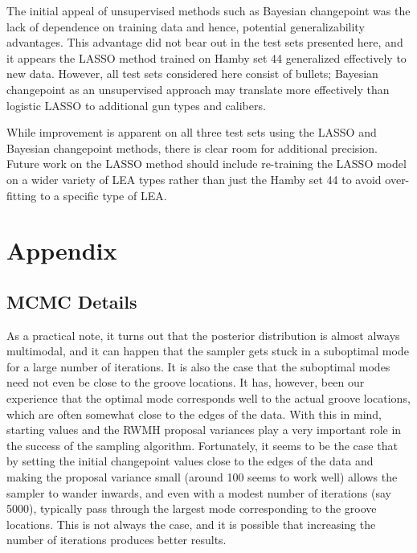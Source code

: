 \documentclass[12pt]{article}
\begin{document}
The initial appeal of unsupervised methods such as Bayesian changepoint
was the lack of dependence on training data and hence, potential
generalizability advantages. This advantage did not bear out in the test
sets presented here, and it appears the LASSO method trained on Hamby
set 44 generalized effectively to new data. However, all test sets
considered here consist of {\color{teal}{9mm?}} bullets; Bayesian
changepoint as an unsupervised approach may translate more effectively
than logistic LASSO to additional gun types and calibers.

While improvement is apparent on all three test sets using the LASSO and
Bayesian changepoint methods, there is clear room for additional
precision. Future work on the LASSO method should include re-training
the LASSO model on a wider variety of LEA types rather than just the
Hamby set 44 to avoid over-fitting to a specific type of LEA.

\section{Appendix}

\subsection{MCMC Details}

As a practical note, it turns out that the posterior distribution is
almost always multimodal, and it can happen that the sampler gets stuck
in a suboptimal mode for a large number of iterations. It is also the
case that the suboptimal modes need not even be close to the groove
locations. It has, however, been our experience that the optimal mode
corresponds well to the actual groove locations, which are often
somewhat close to the edges of the data. With this in mind, starting
values and the RWMH proposal variances play a very important role in the
success of the sampling algorithm. Fortunately, it seems to be the case
that by setting the initial changepoint values close to the edges of the
data and making the proposal variance small (around 100 seems to work
well) allows the sampler to wander inwards, and even with a modest
number of iterations (say 5000), typically pass through the largest mode
corresponding to the groove locations. This is not always the case, and
it is possible that increasing the number of iterations produces better
results.
\end{document}
